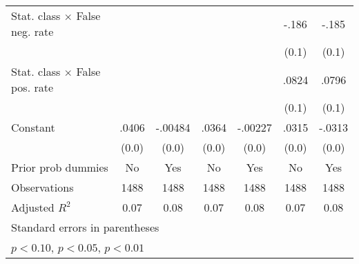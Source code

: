 \begin{table}[htbp]
\begin{tabular}{l*{6}{c}}
Stat. class $\times$ False neg. rate&                  &                  &                  &                  &    -.186\sym{**} &    -.185\sym{**} \\
                &                  &                  &                  &                  &    (0.1)         &    (0.1)         \\
Stat. class $\times$ False pos. rate&                  &                  &                  &                  &    .0824         &    .0796         \\
                &                  &                  &                  &                  &    (0.1)         &    (0.1)         \\
Constant        &    .0406\sym{***}&  -.00484         &    .0364\sym{*}  &  -.00227         &    .0315         &   -.0313         \\
                &    (0.0)         &    (0.0)         &    (0.0)         &    (0.0)         &    (0.0)         &    (0.0)         \\
Prior prob dummies &       No         &      Yes         &       No         &      Yes         &       No         &      Yes         \\
\hline
Observations    &     1488         &     1488         &     1488         &     1488         &     1488         &     1488         \\
Adjusted \(R^{2}\)&     0.07         &     0.08         &     0.07         &     0.08         &     0.07         &     0.08         \\
\hline\hline
\multicolumn{7}{l}{\footnotesize Standard errors in parentheses}\\
\multicolumn{7}{l}{\footnotesize \sym{*} \(p<0.10\), \sym{**} \(p<0.05\), \sym{***} \(p<0.01\)}\\
\end{tabular}
\end{table}
